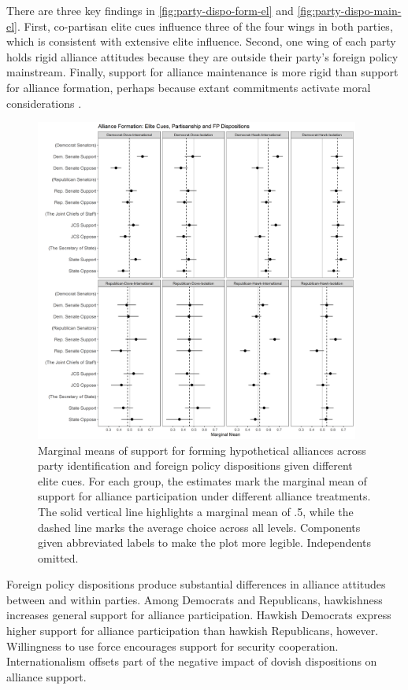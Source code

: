 \documentclass[12pt]{article}
\begin{document}
There are three key findings in \autoref{fig:party-dispo-form-el} and \autoref{fig:party-dispo-main-el}. 
First, co-partisan elite cues influence three of the four wings in both parties, which is consistent with extensive elite influence. 
Second, one wing of each party holds rigid alliance attitudes because they are outside their party's foreign policy mainstream.  
Finally, support for alliance maintenance is more rigid than support for alliance formation, perhaps because extant commitments activate moral considerations \citep{TomzWeeks2021}. 


\begin{figure}[htpb]
	\centering
		\includegraphics[width=0.95\textwidth]{../figures/party-dispo-form-el.png}
	\caption{Marginal means of support for forming hypothetical alliances across party identification and foreign policy dispositions given different elite cues. For each group, the estimates mark the marginal mean of support for alliance participation under different alliance treatments. The solid vertical line highlights a marginal mean of .5, while the dashed line marks the average choice across all levels. Components given abbreviated labels to make the plot more legible. Independents omitted.}
	\label{fig:party-dispo-form-el}
\end{figure}


Foreign policy dispositions produce substantial differences in alliance attitudes between and within parties. 
Among Democrats and Republicans, hawkishness increases general support for alliance participation.
Hawkish Democrats express higher support for alliance participation than hawkish Republicans, however. 
Willingness to use force encourages support for security cooperation. 
Internationalism offsets part of the negative impact of dovish dispositions on alliance support. 
\end{document}
